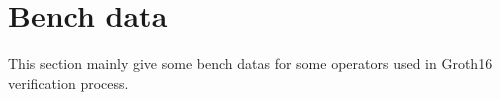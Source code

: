 \section{Bench data} \label{sec:bench-data}

This section mainly give some bench datas for some operators used in Groth16 verification process.



